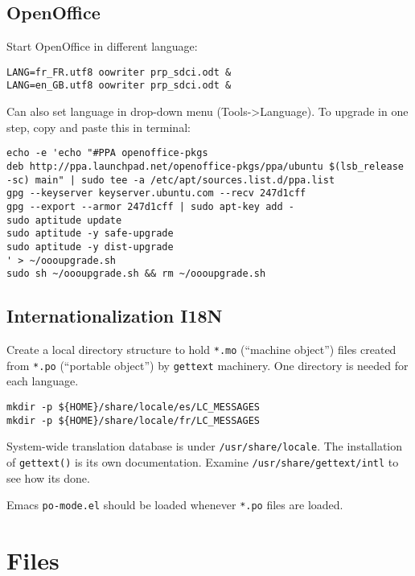 \documentclass[12pt,twoside]{article}
\begin{document}
\subsection{OpenOffice}\label{sxn:ooo}
Start OpenOffice in different language:
\begin{verbatim}
LANG=fr_FR.utf8 oowriter prp_sdci.odt &
LANG=en_GB.utf8 oowriter prp_sdci.odt &
\end{verbatim}
Can also set language in drop-down menu (Tools->Language).
To upgrade in one step, copy and paste this in terminal:
\begin{verbatim}
echo -e 'echo "#PPA openoffice-pkgs
deb http://ppa.launchpad.net/openoffice-pkgs/ppa/ubuntu $(lsb_release -sc) main" | sudo tee -a /etc/apt/sources.list.d/ppa.list
gpg --keyserver keyserver.ubuntu.com --recv 247d1cff
gpg --export --armor 247d1cff | sudo apt-key add -
sudo aptitude update
sudo aptitude -y safe-upgrade
sudo aptitude -y dist-upgrade
' > ~/oooupgrade.sh
sudo sh ~/oooupgrade.sh && rm ~/oooupgrade.sh
\end{verbatim}

\subsection{Internationalization I18N}\label{sxn:i18n}
Create a local directory structure to hold \verb'*.mo' (``machine
object'') files created from \verb'*.po' (``portable object'') by
\verb'gettext' machinery. 
One directory is needed for each language.
\begin{verbatim}
mkdir -p ${HOME}/share/locale/es/LC_MESSAGES
mkdir -p ${HOME}/share/locale/fr/LC_MESSAGES
\end{verbatim}
System-wide translation database is under \verb'/usr/share/locale'.
The installation of \verb'gettext()' is its own documentation.
Examine \verb'/usr/share/gettext/intl' to see how its done.

Emacs \verb'po-mode.el' should be loaded whenever \verb'*.po' files
are loaded.

\clearpage
\section{Files}\label{sxn:fl}
\end{document}

